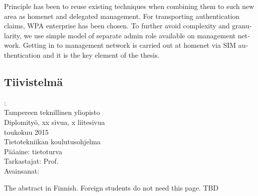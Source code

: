 \documentclass[12pt,a4paper,english]{tutthesis}
\begin{document}
\begin{otherlanguage}{english}
Principle 
has been to reuse existing techniques when combining them to such new area as 
homenet and delegated management.
 For transporting authentication claims, WPA enterprise has been chosen. 
To further avoid complexity and granularity, we
use simple model of separate admin role available on
management network. Getting in to management network is carried out at
homenet via SIM authentication and it is the key element of the thesis.



\end{otherlanguage} %

\begin{otherlanguage}{finnish} %
\chapter*{Tiivistelmä}         %

\begin{spacing}{1.0}
         {\bf \textsf{\MakeUppercase{\@author}}}: \@titleB\\  %
         \textsf{Tampereen teknillinen yliopisto}\\
         \textsf{Diplomityö, xx sivua, x liitesivua}\\ %
         \textsf{toukokuu 2015}\\
         \textsf{Tietotekniikan koulutusohjelma}\\
         \textsf{Pääaine: tietoturva}\\
         \textsf{Tarkastajat:  Prof. \@examiner}\\ %
         \textsf{Avainsanat: }\\
\end{spacing}
The abstract in Finnish. Foreign students do not need this page.
TBD
\end{otherlanguage} %
\end{document}
